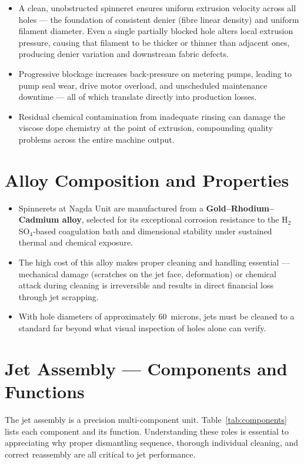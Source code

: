 \documentclass{book}
\begin{document}
\begin{itemize}[leftmargin=1.5em]
  \item A clean, unobstructed spinneret ensures uniform extrusion velocity across all holes --- the foundation of consistent denier (fibre linear density) and uniform filament diameter. Even a single partially blocked hole alters local extrusion pressure, causing that filament to be thicker or thinner than adjacent ones, producing denier variation and downstream fabric defects.
  \item Progressive blockage increases back-pressure on metering pumps, leading to pump seal wear, drive motor overload, and unscheduled maintenance downtime --- all of which translate directly into production losses.
  \item Residual chemical contamination from inadequate rinsing can damage the viscose dope chemistry at the point of extrusion, compounding quality problems across the entire machine output.
\end{itemize}

\section{Alloy Composition and Properties}

\begin{itemize}[leftmargin=1.5em]
  \item Spinnerets at Nagda Unit are manufactured from a \textbf{Gold--Rhodium--Cadmium alloy}, selected for its exceptional corrosion resistance to the H$_2$SO$_4$-based coagulation bath and dimensional stability under sustained thermal and chemical exposure.
  \item The high cost of this alloy makes proper cleaning and handling essential --- mechanical damage (scratches on the jet face, deformation) or chemical attack during cleaning is irreversible and results in direct financial loss through jet scrapping.
  \item With hole diameters of approximately 60~microns, jets must be cleaned to a standard far beyond what visual inspection of holes alone can verify.
\end{itemize}

\section{Jet Assembly --- Components and Functions}

The jet assembly is a precision multi-component unit. Table~\ref{tab:components} lists each component and its function. Understanding these roles is essential to appreciating why proper dismantling sequence, thorough individual cleaning, and correct reassembly are all critical to jet performance.
\end{document}
